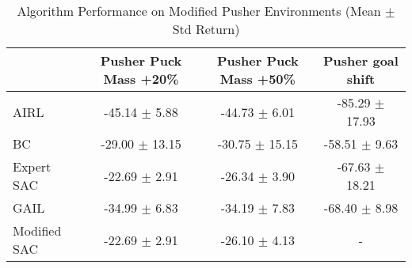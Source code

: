 
\begin{table}
\caption{Algorithm Performance on Modified Pusher Environments (Mean $\pm$ Std Return)}
\label{tab:perf_mod_pusher}
\begin{tabular}{lccc}
\toprule
 & Pusher Puck Mass +20\% & Pusher Puck Mass +50\% & Pusher goal shift \\
\midrule
AIRL & -45.14 $\pm$ 5.88 & -44.73 $\pm$ 6.01 & -85.29 $\pm$ 17.93 \\
BC & -29.00 $\pm$ 13.15 & -30.75 $\pm$ 15.15 & -58.51 $\pm$ 9.63 \\
Expert SAC & -22.69 $\pm$ 2.91 & -26.34 $\pm$ 3.90 & -67.63 $\pm$ 18.21 \\
GAIL & -34.99 $\pm$ 6.83 & -34.19 $\pm$ 7.83 & -68.40 $\pm$ 8.98 \\
Modified SAC & -22.69 $\pm$ 2.91 & -26.10 $\pm$ 4.13 & - \\
\bottomrule
\end{tabular}
\end{table}
